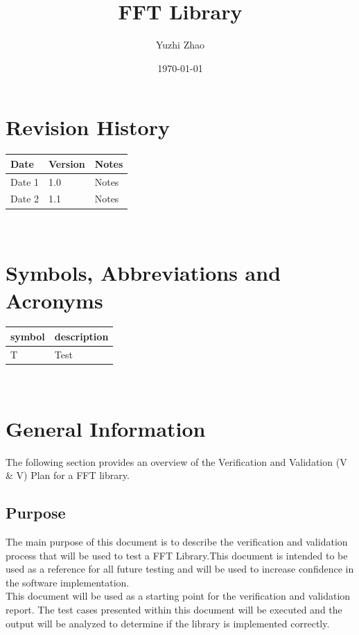 \documentclass[12pt, titlepage]{article}
\begin{document}
\title{FFT Library} 
\author{Yuzhi Zhao}
\date{\today}
	
\maketitle


\section{Revision History}

\begin{tabularx}{\textwidth}{p{3cm}p{2cm}X}
\toprule {\bf Date} & {\bf Version} & {\bf Notes}\\
\midrule
Date 1 & 1.0 & Notes\\
Date 2 & 1.1 & Notes\\
\bottomrule
\end{tabularx}

~\newpage

\section{Symbols, Abbreviations and Acronyms}

\renewcommand{\arraystretch}{1.2}
\begin{tabular}{l l} 
  \toprule		
  \textbf{symbol} & \textbf{description}\\
  \midrule 
  T & Test\\
  \bottomrule
\end{tabular}\\

\newpage

\tableofcontents

\listoftables

\listoffigures

\newpage



\section{General Information}
The following section provides an overview of the Verification and Validation (V \& V) Plan for a FFT library.

\subsection{Purpose}
The main purpose of this document is to describe the verification and validation process
that will be used to test a FFT Library.This document is intended to be used as a reference for all future testing and will be used
to increase confidence in the software implementation.\\
This document will be used as a starting point for the verification and validation report.
The test cases presented within this document will be executed and the output will be
analyzed to determine if the library is implemented correctly.
\end{document}

